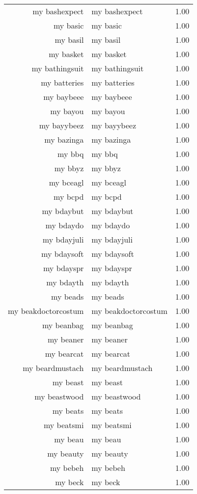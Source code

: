 \begin{table}[ht]
\begin{tabular}{rlr}
  my bashexpect & my bashexpect & 1.00 \\ 
  my basic & my basic & 1.00 \\ 
  my basil & my basil & 1.00 \\ 
  my basket & my basket & 1.00 \\ 
  my bathingsuit & my bathingsuit & 1.00 \\ 
  my batteries & my batteries & 1.00 \\ 
  my baybeee & my baybeee & 1.00 \\ 
  my bayou & my bayou & 1.00 \\ 
  my bayybeez & my bayybeez & 1.00 \\ 
  my bazinga & my bazinga & 1.00 \\ 
  my bbq & my bbq & 1.00 \\ 
  my bbyz & my bbyz & 1.00 \\ 
  my bceagl & my bceagl & 1.00 \\ 
  my bcpd & my bcpd & 1.00 \\ 
  my bdaybut & my bdaybut & 1.00 \\ 
  my bdaydo & my bdaydo & 1.00 \\ 
  my bdayjuli & my bdayjuli & 1.00 \\ 
  my bdaysoft & my bdaysoft & 1.00 \\ 
  my bdayspr & my bdayspr & 1.00 \\ 
  my bdayth & my bdayth & 1.00 \\ 
  my beads & my beads & 1.00 \\ 
  my beakdoctorcostum & my beakdoctorcostum & 1.00 \\ 
  my beanbag & my beanbag & 1.00 \\ 
  my beaner & my beaner & 1.00 \\ 
  my bearcat & my bearcat & 1.00 \\ 
  my beardmustach & my beardmustach & 1.00 \\ 
  my beast & my beast & 1.00 \\ 
  my beastwood & my beastwood & 1.00 \\ 
  my beats & my beats & 1.00 \\ 
  my beatsmi & my beatsmi & 1.00 \\ 
  my beau & my beau & 1.00 \\ 
  my beauty & my beauty & 1.00 \\ 
  my bebeh & my bebeh & 1.00 \\ 
  my beck & my beck & 1.00 \\ 

\end{tabular}
\end{table}
